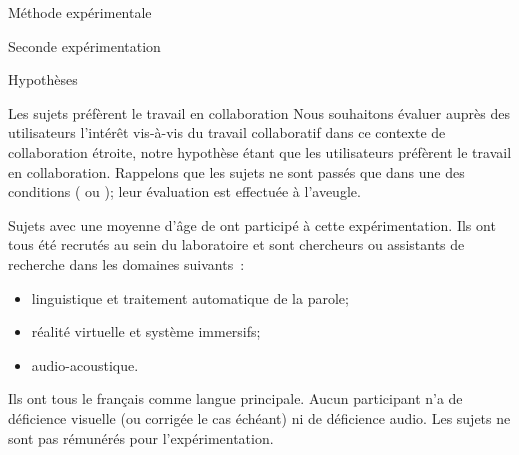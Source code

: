 \documentclass[myfrancais,ngerman,english,frenchb]{mythesis}
\begin{document}
\begin{mychapter}{Méthode expérimentale}
\begin{mysection}{Seconde expérimentation}
\begin{mysubsection}{Hypothèses}
\begin{myparagraph}{ Les sujets préfèrent le travail en collaboration}
					Nous souhaitons évaluer auprès des utilisateurs l'intérêt vis-à-vis du travail collaboratif dans ce contexte de collaboration étroite, notre hypothèse étant que les utilisateurs préfèrent le travail en collaboration.
					Rappelons que les sujets ne sont passés que dans une des conditions ( ou ); leur évaluation est effectuée à l'aveugle.
				\end{myparagraph}
			\end{mysubsection}
			\begin{mysubsection}{Sujets}
				 avec une moyenne d'âge de  ont participé à cette expérimentation.
				Ils ont tous été recrutés au sein du laboratoire  et sont chercheurs ou assistants de recherche dans les domaines suivants~:
				\begin{itemize}
					\item linguistique et traitement automatique de la parole;
					\item réalité virtuelle et système immersifs;
					\item audio-acoustique.
				\end{itemize}
				Ils ont tous le français comme langue principale.
				Aucun participant n'a de déficience visuelle (ou corrigée le cas échéant) ni de déficience audio.
				Les sujets ne sont pas rémunérés pour l'expérimentation.


\end{mysubsection}
\end{mysection}
\end{mychapter}
\end{document}
